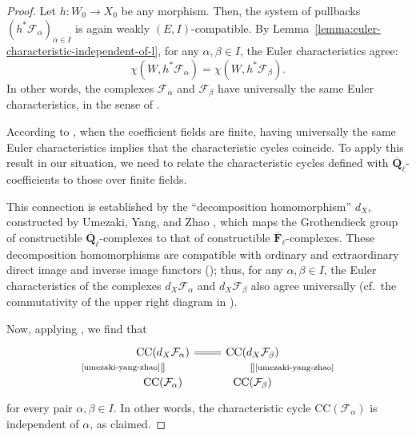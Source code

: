 \documentclass[english]{smfart}
\renewcommand{\mathbb}{\mathbf}
\theoremstyle{remark}
\theoremstyle{plain}
\theoremstyle{definition}
\numberwithin{equation}{remark}
\theoremstyle{void}
\begin{document}
\begin{proof}
Let \(h\colon W_0 \to X_0\) be any morphism.  Then, the system of
pullbacks \((h^*\mathcal{F}_\alpha)_{\alpha \in I}\) is again weakly
\((E, I)\)-compatible.  By
Lemma~\ref{lemma:euler-characteristic-independent-of-l}, for any
\(\alpha, \beta \in I\), the Euler characteristics agree:
\[
\chi(W, h^{*}\mathcal{F}_\alpha) = \chi(W, h^{*}\mathcal{F}_\beta).
\]
In other words, the complexes \(\mathcal{F}_\alpha\) and
\(\mathcal{F}_\beta\) have universally the same Euler characteristics,
in the sense of
\cite[Definition~3.1]{saito-yatagawa_wild-ramification-determines-characteristic-cycle}.

According to
\cite{saito-yatagawa_wild-ramification-determines-characteristic-cycle},
when the coefficient fields are finite, having universally the same
Euler characteristics implies that the characteristic cycles coincide.
To apply this result in our situation, we need to relate the
characteristic cycles defined with
\(\overline{\mathbb{Q}}_\ell\)-coefficients to those over finite
fields.

This connection is established by the ``decomposition homomorphism''
\(d_X\), constructed by Umezaki, Yang, and Zhao
\cite[\S5.2.6]{umezaki-yang-zhao}, which maps the Grothendieck group
of constructible \(\overline{\mathbb{Q}}_\ell\)-complexes to that of
constructible \(\overline{\mathbb{F}}_\ell\)-complexes.  These
decomposition homomorphisms are compatible with ordinary and
extraordinary direct image and inverse image functors
(\cite[\S5.2.7]{umezaki-yang-zhao}); thus, for any
\(\alpha, \beta \in I\), the Euler characteristics of the complexes
\(d_X\mathcal{F}_\alpha\) and \(d_X\mathcal{F}_\beta\) also agree
universally (cf.~the commutativity of the upper right diagram in
\cite[(5.2.7.1)]{umezaki-yang-zhao}).

Now, applying \cite[Proposition~3.4]{saito-yatagawa_wild-ramification-determines-characteristic-cycle}, we find that
\[
\begin{tikzcd}[row sep=small]
\mathrm{CC}(d_{X}\mathcal{F}_{\alpha}) \ar[r,equal] \ar[d,equal,"\text{\cite[5.{3}.2]{umezaki-yang-zhao}}",swap] & \mathrm{CC}(d_{X}\mathcal{F}_{\beta}) \ar[d,equal,"\text{\cite[5.{3}.2]{umezaki-yang-zhao}}"] \\
\mathrm{CC}(\mathcal{F}_{\alpha}) & \mathrm{CC}(\mathcal{F}_{\beta})
\end{tikzcd}
\]
for every pair \(\alpha, \beta \in I\).  In other words, the
characteristic cycle \(\mathrm{CC}(\mathcal{F}_{\alpha})\) is
independent of \(\alpha\), as claimed.
\end{proof}
\end{document}
